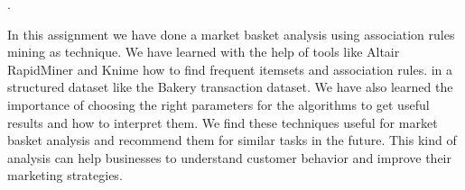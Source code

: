 \label{chap:conclusion}

\cite{DataScience}.

In this assignment we have done a market basket analysis using association rules mining as technique.
We have learned with the help of tools like Altair RapidMiner and Knime how to find frequent itemsets and association rules.
in a structured dataset like the Bakery transaction dataset. We have also learned the importance of choosing the
right parameters for the algorithms to get useful results and how to interpret them. We find these techniques useful
for market basket analysis and recommend them for similar tasks in the future. This kind of analysis can help businesses
to understand customer behavior and improve their marketing strategies.